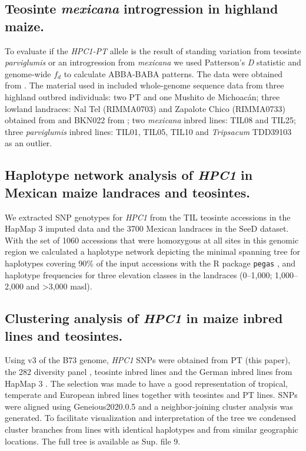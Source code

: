\documentclass[9pt,twocolumn,twoside,lineno]{biorxiv}
\def\code#1{\texttt{#1}}
\newcommand{\mex}{\textit{mexicana}\xspace}
\newcommand{\hpc}{\textit{HPC1}\xspace}
\newcommand{\parv}{\textit{parviglumis}\xspace}
\begin{document}
\subsection{Teosinte \mex introgression in highland maize.}
To evaluate if the \textit{HPC1-PT} allele is the result of standing variation from teosinte \parv or an introgression from \mex we used Patterson's \textit{D} \cite{Patterson2012-sw} statistic and genome-wide $f_{d}$ \cite{Martin2015-ee} to calculate ABBA-BABA patterns. 
The data were obtained from \cite{Gonzalez-Segovia2019-jy}. 
The material used in \cite{Gonzalez-Segovia2019-jy} included whole-genome sequence data from three highland outbred individuals: two PT and one Mushito de Michoacán; three lowland landraces: Nal Tel (RIMMA0703) and Zapalote Chico (RIMMA0733) obtained from \cite{Wang2017-bc} and  BKN022 from \cite{Bukowski2017-ng}; two \mex inbred lines: TIL08 and TIL25; three \parv inbred lines: TIL01, TIL05, TIL10 and \textit{Tripsacum} TDD39103 \cite{Bukowski2017-ng} as an outlier. 
\subsection{Haplotype network analysis of \hpc in Mexican maize landraces and teosintes.}
We extracted SNP genotypes for \hpc from the TIL teosinte accessions in the HapMap 3 imputed data \cite{Bukowski2017-ng} and the 3700 Mexican landraces in the SeeD dataset. 
With the set of 1060 accessions that were homozygous at all sites in this genomic region we calculated a haplotype network depicting the minimal spanning tree for haplotypes covering 90\% of the input accessions with the R package \code{pegas} \cite{paradis2010}, and haplotype frequencies for three elevation classes in the landraces (0--1,000; 1,000--2,000 and >3,000 masl).
\subsection{Clustering analysis of \hpc in maize inbred lines and teosintes.}
Using v3 of the B73 genome, \hpc SNPs were obtained from PT (this paper), the 282 diversity panel \cite{Flint-Garcia2005-hb}, teosinte inbred lines and the German inbred lines from HapMap 3 \cite{Bukowski2017-ng}. 
The selection was made to have a good representation of tropical, temperate and European inbred lines together with teosintes and PT lines.
SNPs were aligned using Geneious2020.0.5 and a neighbor-joining cluster analysis was generated. 
To facilitate visualization and interpretation of the tree we condensed cluster branches from lines with identical haplotypes and from similar geographic locations. 
The full tree is available as Sup. file 9. 
\end{document}
